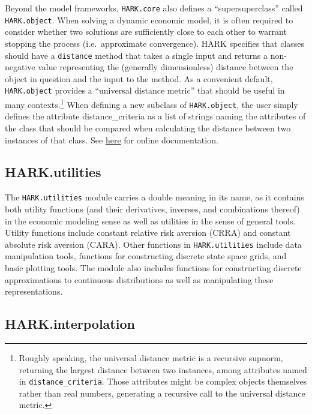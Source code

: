 \documentclass[10pt,twocolumn]{article}
\let\rmarkdownfootnote\footnote%
\def\footnote{\protect\rmarkdownfootnote}
\begin{document}
Beyond the model frameworks, \texttt{HARK.core} also defines a ``supersuperclass'' called \texttt{HARK.object}. When solving a dynamic economic model, it is often required to consider whether two solutions are sufficiently close to each other to warrant stopping the process (i.e.~approximate convergence). HARK specifies that classes should have a \texttt{distance} method that takes a single input and returns a non-negative value representing the (generally dimensionless) distance between the object in question and the input to the method. As a convenient default, \texttt{HARK.object} provides a ``universal distance metric'' that should be useful in many contexts.\footnote{Roughly speaking, the universal distance metric is a recursive supnorm, returning the largest distance between two instances, among attributes named in \texttt{distance\_criteria}. Those attributes might be complex objects themselves rather than real numbers, generating a recursive call to the universal distance metric.} When defining a new subclass of \texttt{HARK.object}, the user simply defines the attribute distance\_criteria as a list of strings naming the attributes of the class that should be compared when calculating the distance between two instances of that class. See \href{https://econ-\%20ark.github.io/HARK/generated/HARK.core.html}{here} for online documentation.

\subsection{HARK.utilities}\label{harkutilities}

The \texttt{HARK.utilities} module carries a double meaning in its name,
as it contains both utility functions (and their derivatives, inverses,
and combinations thereof) in the economic modeling sense as well as
utilities in the sense of general tools. Utility functions include
constant relative risk aversion (CRRA) and constant absolute risk
aversion (CARA). Other functions in \texttt{HARK.utilities} include data
manipulation tools, functions for constructing discrete state space
grids, and basic plotting tools. The module also includes functions for
constructing discrete approximations to continuous distributions as well
as manipulating these representations.

\subsection{HARK.interpolation}\label{harkinterpolation}
\end{document}
